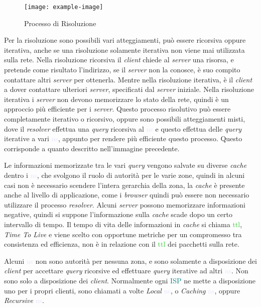 \documentclass{article}
\numberwithin{equation}{subsection}
\begin{document}
\begin{figure}[H]%
    \centering%
    \texttt{[image: example-image]}%
    \caption{Processo di Risoluzione}%
\end{figure}

Per la risoluzione sono possibili vari atteggiamenti, può essere ricorsiva oppure iterativa, anche se una risoluzione solamente iterativa non viene mai utilizzata sulla rete. Nella risoluzione ricorsiva il \textit{client} chiede al \textit{server} una risorsa, 
e pretende come risultato l'indirizzo, se il \textit{server} non la conosce, è suo compito contattare altri \textit{server} per ottenerla. Mentre nella risoluzione iterativa, è il \textit{client} a dover 
contattare ulteriori \textit{server}, specificati dal \textit{server} iniziale. Nella risoluzione iterativa i \textit{server} non devono memorizzare lo stato della rete, quindi è un approccio più efficiente per i \textit{server}. 
Questo processo risolutivo può essere completamente iterativo o ricorsivo, oppure sono possibili atteggiamenti misti, dove il \textit{resolver} effettua una \textit{query} ricorsiva al \textcolor{Lavender}{ns} e questo effettua delle \textit{query} iterative a vari \textcolor{Lavender}{ns}, appunto per rendere più efficiente questo processo. Questo corrisponde a quanto descritto nell'immagine precedente. 


Le informazioni memorizzate tra le vari \textit{query} vengono salvate su diverse \textit{cache} dentro i \textcolor{Lavender}{ns}, che svolgono il ruolo di autorità per le varie zone, quindi in alcuni casi 
non è necessario scendere l'intera gerarchia della zona, la \textit{cache} è presente anche al livello di applicazione, come i \textit{browser} quindi può essere non necessario utilizzare il processo \textit{resolver}. 
Alcuni \textit{server} possono memorizzare informazioni negative, quindi si suppone l'informazione sulla \textit{cache} scade dopo un certo intervallo di tempo. Il tempo di vita delle informazioni in \textit{cache} si chiama \textcolor{LimeGreen}{ttl}, \textit{Time To Live} e viene scelto con 
opportune metriche per un compromesso tra consistenza ed efficienza, non è in relazione con il \textcolor{LimeGreen}{ttl} dei pacchetti sulla rete. 

Alcuni \textcolor{Lavender}{ns} non sono autorità per nessuna zona, e sono solamente a disposizione dei \textit{client} per accettare \textit{query} ricorsive ed effettuare \textit{query} iterative ad altri \textcolor{Lavender}{ns}. 
Non sono solo a disposizione dei \textit{client}. Normalmente ogni \textcolor{teal}{ISP} ne mette a disposizione uno per i propri clienti, sono chiamati a volte \textit{Local} \textcolor{Lavender}{ns}, o \textit{Caching} \textcolor{Lavender}{ns}, oppure 
\textit{Recursive} \textcolor{Lavender}{ns}. 
\end{document}
